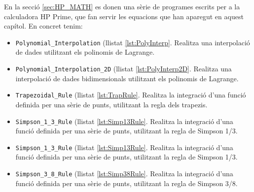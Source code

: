 En la secció \vref{sec:HP_MATH} es donen  una sèrie de programes escrits per a la calculadora \textsf{HP Prime},
 que fan servir les equacions que han aparegut en aquest capítol. En concret tenim:

\begin{itemize}
   \item \texttt{Polynomial\_Interpolation} (llistat \vref{lst:PolyInterp}. Realitza una interpolació de dades utilitzant els polinomis de Lagrange.
   \item \texttt{Polynomial\_Interpolation\_2D} (llistat \vref{lst:PolyInterp2D}. Realitza una interpolació de dades bidimensionals utilitzant els polinomis de Lagrange.
    \item \texttt{Trapezoidal\_Rule} (llistat \vref{lst:TrapRule}. Realitza la integració d'una funció definida per una sèrie de punts, utilitzant la regla dels trapezis.
    \item \texttt{Simpson\_1\_3\_Rule} (llistat \vref{lst:Simp13Rule}. Realitza la integració d'una funció definida per una sèrie de punts, utilitzant la regla de Simpson 1/3.
    \item \texttt{Simpson\_1\_3\_Rule} (llistat \vref{lst:Simp13Rule}. Realitza la integració d'una funció definida per una sèrie de punts, utilitzant la regla de Simpson 1/3.
    \item \texttt{Simpson\_3\_8\_Rule} (llistat \vref{lst:Simp38Rule}. Realitza la integració d'una funció definida per una sèrie de punts, utilitzant la regla de Simpson 3/8.
\end{itemize}
